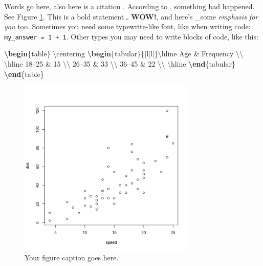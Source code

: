 \documentclass[man,longtable,noextraspace,floatsintext]{apa6}
\newenvironment{Shaded}{}{}
\newcommand{\ExtensionTok}[1]{#1}
\newcommand{\FunctionTok}[1]{\textcolor[rgb]{0.02,0.16,0.49}{#1}}
\newcommand{\KeywordTok}[1]{\textcolor[rgb]{0.00,0.44,0.13}{\textbf{#1}}}
\newcommand{\NormalTok}[1]{#1}
\newcommand{\OperatorTok}[1]{\textcolor[rgb]{0.40,0.40,0.40}{#1}}
\begin{document}
Words go here, also here is a citation \autocite{someArticle}. According
to \textcite{anotherArticle}, something bad happened. See Figure
\ref{fig:myplot}. This is a bold statement\ldots{} \textbf{WOW!}, and
here's \_some \emph{emphasis for you} too. Sometimes you need some
typewrite-like font, like when writing code:
\texttt{my\_answer\ =\ 1\ +\ 1}. Other types you may need to write
blocks of code, like this:

\begin{Shaded}
\begin{Highlighting}[]
\KeywordTok{\textbackslash{}begin}\NormalTok{\{}\ExtensionTok{table}\NormalTok{\}}
\FunctionTok{\textbackslash{}centering}
\KeywordTok{\textbackslash{}begin}\NormalTok{\{}\ExtensionTok{tabular}\NormalTok{\}\{|l|l|\}}\FunctionTok{\textbackslash{}hline}
\NormalTok{Age }\OperatorTok{&}\NormalTok{ Frequency }\FunctionTok{\textbackslash{}\textbackslash{}} \FunctionTok{\textbackslash{}hline}
\NormalTok{18--25  }\OperatorTok{&}\NormalTok{ 15 }\FunctionTok{\textbackslash{}\textbackslash{}}
\NormalTok{26--35  }\OperatorTok{&}\NormalTok{ 33 }\FunctionTok{\textbackslash{}\textbackslash{}}
\NormalTok{36--45  }\OperatorTok{&}\NormalTok{ 22 }\FunctionTok{\textbackslash{}\textbackslash{}} \FunctionTok{\textbackslash{}hline}
\KeywordTok{\textbackslash{}end}\NormalTok{\{}\ExtensionTok{tabular}\NormalTok{\}}
\KeywordTok{\textbackslash{}end}\NormalTok{\{}\ExtensionTok{table}\NormalTok{\}}
\end{Highlighting}
\end{Shaded}

\begin{figure}
\centering
\includegraphics[width=3.333in,height=3.333in]{plot.png}
\caption{Your figure caption goes here.\label{fig:myplot}}
\end{figure}
\end{document}
